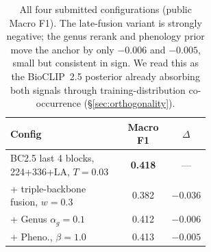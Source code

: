 \begin{table}[ht]
  \centering
  \small
  \setlength{\tabcolsep}{4pt}
  \begin{tabular}{@{}p{0.58\linewidth}cc@{}}
    \toprule
    Config & Macro F1 & $\Delta$ \\
    \midrule
    BC2.5 last 4 blocks, 224+336+LA, $T{=}0.03$ & \textbf{0.418} & --- \\
    \hspace{1em}+ triple-backbone fusion, $w{=}0.3$ & 0.382 & $-0.036$ \\
    \hspace{1em}+ Genus $\alpha_g{=}0.1$ & 0.412 & $-0.006$ \\
    \hspace{1em}+ Pheno., $\beta{=}1.0$ & 0.413 & $-0.005$ \\
    \bottomrule
  \end{tabular}
  \caption{All four submitted configurations (public Macro F1). The late-fusion variant is strongly negative; the genus rerank and phenology prior move the anchor by only $-0.006$ and $-0.005$, small but consistent in sign. We read this as the BioCLIP~2.5 posterior already absorbing both signals through training-distribution co-occurrence (\S\ref{sec:orthogonality}).}
  \label{tab:summary}
\end{table}
